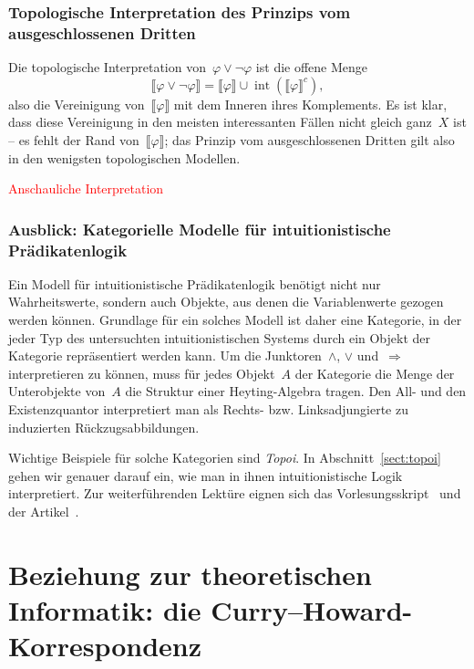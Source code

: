 \documentclass[a4paper,ngerman,12pt]{scrartcl}
\theoremstyle{definition}
\theoremstyle{plain}
\theoremstyle{remark}
\newcommand{\brak}[1]{\llbracket {#1} \rrbracket}
\DeclareMathOperator{\interior}{int}
\renewcommand{\_}{\mathpunct{.}\,}
\newcommand{\?}{\,{:}\,}
\newcommand{\XXX}[1]{\textcolor{red}{#1}}
\begin{document}
\subsubsection*{Topologische Interpretation des Prinzips vom ausgeschlossenen
Dritten}

Die topologische Interpretation von~$\varphi \vee \neg\varphi$ ist die offene
Menge
\[ \brak{\varphi \vee \neg\varphi} = \brak{\varphi} \cup \interior
(\brak{\varphi}^c), \]
also die Vereinigung von~$\brak{\varphi}$ mit dem Inneren ihres Komplements. Es
ist klar, dass diese Vereinigung in den meisten interessanten Fällen nicht
gleich ganz~$X$ ist -- es fehlt der Rand von~$\brak{\varphi}$; das Prinzip vom
ausgeschlossenen Dritten gilt also in den
wenigsten topologischen Modellen.

\XXX{Anschauliche Interpretation}


\subsubsection*{Ausblick: Kategorielle Modelle für intuitionistische Prädikatenlogik}

Ein Modell für intuitionistische Prädikatenlogik benötigt nicht nur
Wahrheitswerte, sondern auch Objekte, aus denen die Variablenwerte gezogen
werden können. Grundlage für ein solches Modell ist daher eine Kategorie, in der
jeder Typ des untersuchten intuitionistischen Systems durch ein Objekt der
Kategorie repräsentiert werden kann. Um die Junktoren~$\wedge$, $\vee$
und~$\Rightarrow$ interpretieren zu können, muss für jedes Objekt~$A$ der
Kategorie die Menge der Unterobjekte von~$A$ die Struktur einer Heyting-Algebra
tragen. Den All- und den Existenzquantor interpretiert man als Rechts-
bzw. Linksadjungierte zu induzierten Rückzugsabbildungen.

Wichtige Beispiele für solche Kategorien sind \emph{Topoi}. In
Abschnitt~\ref{sect:topoi} gehen wir genauer darauf ein, wie man in ihnen
intuitionistische Logik interpretiert.
Zur weiterführenden Lektüre eignen sich das
Vorlesungsskript~\cite{streicher:ctcl} und der Artikel~\cite{vickers:loctop}.


\section[Beziehung zur theoretischen Informatik: die
Curry--Howard-Korrespondenz]{Beziehung zur theoretischen Informatik: \newline die
Curry--Howard-Korrespondenz}
\label{curry-howard}
\end{document}
